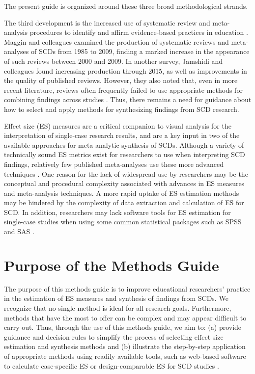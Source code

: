 \documentclass[
]{book}
\begin{document}
The present guide is organized around these three broad methodological strands.

The third development is the increased use of systematic review and meta-analysis procedures to identify and affirm evidence-based practices in education \citep{Beretvas2008review, Shadish2007methods}.
Maggin and colleagues \citeyearpar{maggin2011Quantitative} examined the production of systematic reviews and meta-analyses of SCDs from 1985 to 2009, finding a marked increase in the appearance of such reviews between 2000 and 2009.
In another survey, Jamshidi and colleagues \citeyearpar{jamshidi2018Methodological} found increasing production through 2015, as well as improvements in the quality of published reviews.
However, they also noted that, even in more recent literature, reviews often frequently failed to use appropriate methods for combining findings across studies \citep{jamshidi2018Methodological}.
Thus, there remains a need for guidance about how to select and apply methods for synthesizing findings from SCD research.

Effect size (ES) measures are a critical companion to visual analysis for the interpretation of single-case research results, and are a key input in two of the available approaches for meta-analytic synthesis of SCDs.
Although a variety of technically sound ES metrics exist for researchers to use when interpreting SCD findings, relatively few published meta-analyses use these more advanced techniques \citep[cf.][]{barton2017TechnologyAided, Maggin2017meta-analysis, jamshidi2018Methodological}.
One reason for the lack of widespread use by researchers may be the conceptual and procedural complexity associated with advances in ES measures and meta-analysis techniques.
A more rapid uptake of ES estimation methods may be hindered by the complexity of data extraction and calculation of ES for SCD.
In addition, researchers may lack software tools for ES estimation for single-case studies when using some common statistical packages such as SPSS and SAS \citep{odom2018Betweencase, Pustejovsky2014design, shadish2015Role}.

\hypertarget{purpose-of-the-methods-guide}{%
\section{Purpose of the Methods Guide}\label{purpose-of-the-methods-guide}}

The purpose of this methods guide is to improve educational researchers' practice in the estimation of ES measures and synthesis of findings from SCDs.
We recognize that no single method is ideal for all research goals.
Furthermore, methods that have the most to offer can be complex and may appear difficult to carry out.
Thus, through the use of this methods guide, we aim to: (a) provide guidance and decision rules to simplify the process of selecting effect size estimation and synthesis methods and (b) illustrate the step-by-step application of appropriate methods using readily available tools, such as web-based software to calculate case-specific ES or design-comparable ES for SCD studies \citep[e.g.,][]{pustejovsky2021scdhlm}.
\end{document}
